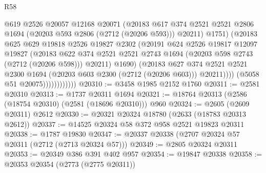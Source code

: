 \begin{lexlean}{R58}
\begin{coremodule}
                                @619
                                @2526
                                @20057
                                @12168
                                @20071
                                (@20183
                                  @617
                                  @374
                                  @2521
                                  @2521
                                  @2806
                                  @1694
                                  (@20203 @593 @2806 (@2712 (@20206 @593)))
                                  @20211)
                                @1751)
                              (@20183
                                @625
                                @629
                                @19818
                                @2526
                                @19827
                                @2302
                                (@20191
                                  @624
                                  @2526
                                  @19817
                                  @12097
                                  @19827
                                  (@20183
                                    @622
                                    @374
                                    @2521
                                    @2521
                                    @2743
                                    @1694
                                    (@20203 @598 @2743 (@2712 (@20206 @598)))
                                    @20211)
                                  @1690)
                                (@20183
                                  @627
                                  @374
                                  @2521
                                  @2521
                                  @2300
                                  @1694
                                  (@20203 @603 @2300 (@2712 (@20206 @603)))
                                  @20211))))
                          (@5058 @51 @20075))))))))))))
@20310 := @3458 @1985 @2152 @1760
@20311 := @2581 @20310
@20313 := @1737 @20311 @1694
@20321 := @18764 @20313 (@2586 (@18754 @20310) (@2581 (@18696 @20310))) @960
@20324 := @2605 (@2609 @20311) @2612
@20330 := @20321 @20324 @18780 (@2633 (@18783 @20313 @2612))
@20337 := @14525 @20324 @58 @372 @958 @2521 @19823 @20311
@20338 := @1787 @19830
@20347 := @20337 @20338 (@2707 @20324 @57 @20311 (@2712 (@2713 @20324 @57)))
@20349 := @2805 @20324 @20311
@20353 := @20349 @386 @391 @402 @957
@20354 := @19847 @20338
@20358 := @20353 @20354 (@2773 (@2775 @20311))

\end{coremodule}
\end{lexlean}
